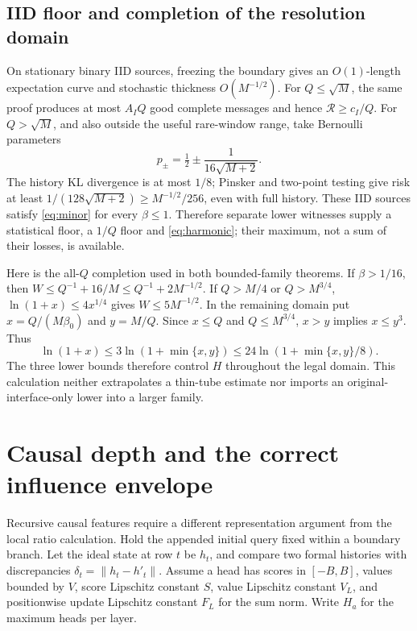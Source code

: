 \documentclass[11pt,letterpaper]{article}
\theoremstyle{definition}\newtheorem{definition}[theorem]{Definition}
\theoremstyle{remark}\newtheorem{remark}[theorem]{Remark}
\newcommand{\betaz}{\beta_0}
\newcommand{\Risk}{\mathcal{R}}
\begin{document}
\subsection{IID floor and completion of the resolution domain}\label{sec:completion}
On stationary binary IID sources, freezing the boundary gives an $O(1)$-length expectation curve and stochastic thickness $O(M^{-1/2})$. For $Q\le\sqrt M$, the same proof produces at most $A_IQ$ good complete messages and hence $\Risk\ge c_I/Q$. For $Q>\sqrt M$, and also outside the useful rare-window range, take Bernoulli parameters
\[
 p_\pm=\tfrac12\pm\frac1{16\sqrt{M+2}}.
\]
The history KL divergence is at most $1/8$; Pinsker and two-point testing give risk at least $1/(128\sqrt{M+2})\ge M^{-1/2}/256$, even with full history. These IID sources satisfy \eqref{eq:minor} for every $\beta\le1$. Therefore separate lower witnesses supply a statistical floor, a $1/Q$ floor and \eqref{eq:harmonic}; their maximum, not a sum of their losses, is available.

Here is the all-$Q$ completion used in both bounded-family theorems. If $\beta>1/16$, then $W\le Q^{-1}+16/M\le Q^{-1}+2M^{-1/2}$. If $Q>M/4$ or $Q>M^{3/4}$, $\ln(1+x)\le4x^{1/4}$ gives $W\le5M^{-1/2}$. In the remaining domain put $x=Q/(M\betaz)$ and $y=M/Q$. Since $x\le Q$ and $Q\le M^{3/4}$, $x>y$ implies $x\le y^3$. Thus
\[
 \ln(1+x)\le3\ln(1+\min\{x,y\})
 \le24\ln(1+\min\{x,y\}/8).
\]
The three lower bounds therefore control $H$ throughout the legal domain. This calculation neither extrapolates a thin-tube estimate nor imports an original-interface-only lower into a larger family.

\section{Causal depth and the correct influence envelope}\label{sec:causal}
Recursive causal features require a different representation argument from the local ratio calculation. Hold the appended initial query fixed within a boundary branch. Let the ideal state at row $t$ be $h_t$, and compare two formal histories with discrepancies $\delta_t=\|h_t-h'_t\|$. Assume a head has scores in $[-B,B]$, values bounded by $V$, score Lipschitz constant $S$, value Lipschitz constant $V_L$, and positionwise update Lipschitz constant $F_L$ for the sum norm. Write $H_a$ for the maximum heads per layer.
\end{document}
